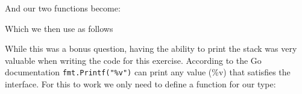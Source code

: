 \begin{Answer}
\noindent{}And our two functions become:


Which we then use as follows
\newpage



\Question While this was a bonus question, having the ability to print
the stack was very valuable when writing the code for this exercise.
According to the Go documentation \lstinline{fmt.Printf("%v")} can
print any value (\%v) that satisfies the  interface.
For this to work we only need to define a  function for
our type:

\end{Answer}
